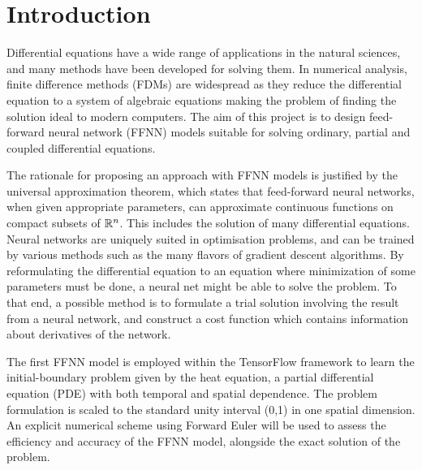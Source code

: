 \section{Introduction}\label{sec:Introduction}

Differential equations have a wide range of applications in the natural sciences, and many methods have been developed for solving them. In numerical analysis, finite difference methods (FDMs) are widespread as they reduce the differential equation to a system of algebraic equations making the problem of finding the solution ideal to modern computers. The aim of this project is to design feed-forward neural network (FFNN) models suitable for solving ordinary, partial and coupled differential equations. 

The rationale for proposing an approach with FFNN models is justified by the universal approximation theorem, which states that feed-forward neural networks, when given appropriate parameters, can approximate continuous functions on compact subsets of $\mathbb{R}^n$. This includes the solution of many differential equations. Neural networks are uniquely suited in optimisation problems, and can be trained by various methods such as the many flavors of gradient descent algorithms. By reformulating the differential equation to an equation where minimization of some parameters must be done, a neural net might be able to solve the problem. To that end, a possible method is to formulate a trial solution involving the result from a neural network, and construct a cost function which contains information about derivatives of the network.

The first FFNN model is employed within the TensorFlow framework to learn the initial-boundary problem given by the heat equation, a partial differential equation (PDE) with both temporal and spatial dependence. The problem formulation is scaled to the standard unity interval (0,1) in one spatial dimension. An explicit numerical scheme using Forward Euler will be used to assess the efficiency and accuracy of the FFNN model, alongside the exact solution of the problem. 

